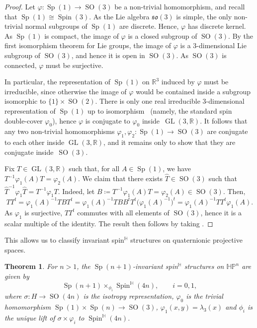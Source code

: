 \documentclass[pdftex]{sigma}
\numberwithin{equation}{section}
\newtheorem{Theorem}{Theorem}[section]
\DeclareMathOperator{\GL}{GL}
\DeclareMathOperator{\SO}{SO}
\DeclareMathOperator{\Spin}{Spin}
\DeclareMathOperator{\Sp}{Sp}
\begin{document}
		\begin{proof}
			Let $\varphi \colon \Sp(1) \to \SO(3)$ be a non-trivial homomorphism, and recall that $\Sp(1) \cong \Spin(3)$. As the Lie algebra $\mathfrak{so}(3)$ is simple, the only non-trivial normal subgroups of $\Sp(1)$ are discrete. Hence, $\varphi$ has discrete kernel. As $\Sp(1)$ is compact, the image of $\varphi$ is a closed subgroup of $\SO(3)$. By the first isomorphism theorem for Lie groups, the image of $\varphi$ is a $3$-dimensional Lie subgroup of $\SO(3)$, and hence it is open in $\SO(3)$. As $\SO(3)$ is connected, $\varphi$ must be surjective.
			
			In particular, the representation of $\Sp(1)$ on $\mathbb{R}^3$ induced by $\varphi$ must be irreducible, since otherwise the image of $\varphi$ would be contained inside a subgroup isomorphic to $\{1\}\times \SO(2)$. There is only one real irreducible $3$-dimensional representation of $\Sp(1)$ up to isomorphism~\cite[Proposition~11]{irreps} (namely, the standard spin double-cover $\varphi_0$), hence $\varphi$ is conjugate to $\varphi_0$ inside~$\GL(3,\mathbb{R})$. It follows that any two non-trivial homomorphisms $\varphi_1,\varphi_2\colon \Sp(1)\to \SO(3)$ are conjugate to each other inside $\GL(3,\mathbb{R})$, and it remains only to show that they are conjugate inside~$\SO(3)$.
			
			Fix $T \in \GL(3,\mathbb{R})$ such that, for all $A \in \Sp(1)$, we have $T^{-1} \varphi_1(A) T =\varphi_2(A)$. We claim that there exists $\hat{T} \in \SO(3)$ such that $\hat{T}^{-1} \varphi_1 \hat{T} = T^{-1} \varphi_1 T$. Indeed, let $B \coloneqq T^{-1} \varphi_1(A) T =\varphi_2(A)\in \SO(3)$. Then,
			\[
			T T^t = \varphi_1(A)^{-1} T B T^t = \varphi_1(A)^{-1} T B B^t T^t \bigl( \varphi_1(A)^{-1} \bigr)^t = \varphi_1(A)^{-1} T T^t \varphi_1(A) .
			\]
			As $\varphi_1$ is surjective, $TT^t$ commutes with all elements of $\SO(3)$, hence it is a scalar multiple of the identity. The result then follows by taking \smash{$\hat{T} = \det(T)^{-1/3} T \in \SO(3)$}.
		\end{proof}
		
		This allows us to classify invariant spin$^\mathbb{H}$ structures on quaternionic projective spaces.
		
		\begin{Theorem}
			For $n > 1$, the $\Sp(n+1)$-invariant spin$^{\mathbb{H}}$ structures on $\mathbb{HP}^{n}$ are given by
			\begin{equation*}
				\Sp(n+1) \times_{\phi_i} \Spin^{\mathbb{H}}(4n) , \qquad i = 0,1 ,
			\end{equation*}
			where $\sigma \colon H \to \SO(4n)$ is the isotropy representation, $\varphi_0$ is the trivial homomorphism $\Sp(1) \times \Sp(n) \to \SO(3)$, $\varphi_1 (x,y) = \lambda_3 (x)$ and $\phi_i$ is the unique lift of $\sigma \times \varphi_i$ to $\Spin^{\mathbb{H}}(4n)$.
		\end{Theorem}
		
\end{document}
